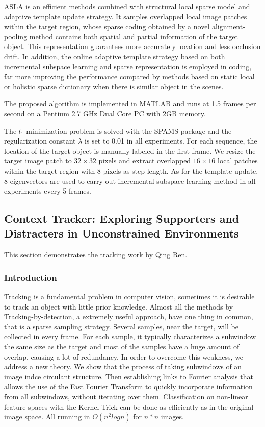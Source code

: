 \documentclass{acm_proc_article-sp}
\begin{document}
ASLA is an efficient methods combined with structural local sparse model and adaptive template update strategy. It samples overlapped local image patches within the target region, whose sparse coding obtained by a novel alignment-pooling method contains both spatial and partial information of the target object. This representation guarantees more accurately location and less occlusion drift. In addition, the online adaptive template strategy based on both incremental subspace learning and sparse representation is employed in coding, far more improving the performance compared by methods based on static local or holistic sparse dictionary when there is similar object in the scenes.

The proposed algorithm is implemented in MATLAB and runs at 1.5 frames per second on a Pentium 2.7 GHz Dual Core PC with 2GB memory.

The $l_1$ minimization problem is solved with the SPAMS package and the regularization constant $\lambda$ is set to 0.01 in all experiments. For each sequence, the location of the target object is manually labeled in the first frame. We resize the target image patch to $32\times 32$ pixels and extract overlapped $16\times16$ local patches within the target region with 8 pixels as step length. As for the template update, 8 eigenvectors are used to carry out incremental subspace learning method in all experiments every 5 frames.

\subsection{Context Tracker: Exploring Supporters and Distracters in Unconstrained Environments}
This section demonstrates the tracking work by Qing Ren.

\subsubsection{Introduction}
Tracking is a fundamental problem in computer vision, sometimes it is desirable to track an object with little prior knowledge. Almost all the methods by Tracking-by-detection, a extremely useful approach, have one thing in common, that is a sparse sampling strategy. Several samples, near the target, will be collected in every frame. For each sample, it typically characterizes a subwindow the same size as the target and most of the samples have a huge amount of overlap, causing a lot of redundancy. In order to overcome this weakness, we address a new theory. We show that the process of taking subwindows of an image indce circulant structure. Then establishing links to Fourier analysis that allows the use of the Fast Fourier Transform to quickly incorporate information from all subwindows, without iterating over them. Classification on non-linear feature spaces with the Kernel Trick can be done as efficiently as in the original image space. All running in $O(n^2 logn)$ for $n * n$ images.
\end{document}
